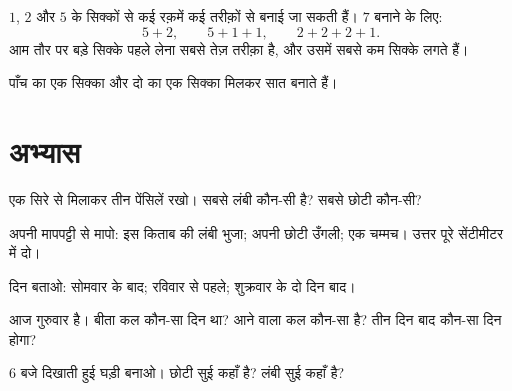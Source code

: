 \begin{example}[रक़म बनाना]\label{ex:g1:measure:coins}
$1$, $2$ और $5$ के सिक्कों से कई रक़में कई तरीक़ों से बनाई जा
सकती हैं। $7$ बनाने के लिए:
\[
5 + 2, \qquad
5 + 1 + 1, \qquad
2 + 2 + 2 + 1 .
\]
आम तौर पर बड़े सिक्के पहले लेना सबसे तेज़ तरीक़ा है, और उसमें
सबसे कम सिक्के लगते हैं।
\end{example}

\begin{omfigure}

{\small पाँच का एक सिक्का और दो का एक सिक्का मिलकर सात बनाते हैं।}
\end{omfigure}

\section{अभ्यास}

\begin{exercise}[$\star$]\label{exo:g1:measure:1}
एक सिरे से मिलाकर तीन पेंसिलें रखो। सबसे लंबी कौन-सी है? सबसे
छोटी कौन-सी?
\end{exercise}

\begin{exercise}[$\star$]\label{exo:g1:measure:2}
अपनी मापपट्टी से मापो: इस किताब की लंबी भुजा; अपनी छोटी
उँगली; एक चम्मच। उत्तर पूरे सेंटीमीटर में दो।
\end{exercise}

\begin{exercise}[$\star$]\label{exo:g1:measure:3}
दिन बताओ: सोमवार के बाद; रविवार से पहले; शुक्रवार के दो दिन बाद।
\end{exercise}

\begin{exercise}[$\star$]\label{exo:g1:measure:4}
आज गुरुवार है। बीता कल कौन-सा दिन था? आने वाला कल कौन-सा है?
तीन दिन बाद कौन-सा दिन होगा?
\end{exercise}

\begin{exercise}[$\star$]\label{exo:g1:measure:5}
$6$ बजे दिखाती हुई घड़ी बनाओ। छोटी सुई कहाँ है? लंबी सुई
कहाँ है?
\end{exercise}

